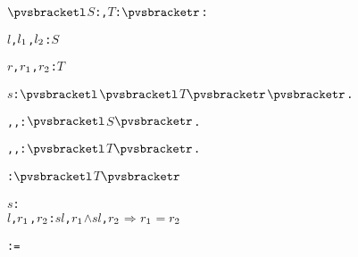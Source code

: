 \def\setsothermembertwofn#1#2{{(#1 \in #2)}}%
\def\opohtwofn#1#2{{#1\circ#2}}%
\def\opdividetwofn#1#2{{\frac{#1}{#2}}}%
\def\optimestwofn#1#2{{#1\times#2}}%
\def\opdifferenceonefn#1{{-#1}}%
\def\opdifferencetwofn#1#2{{#1-#2}}%
\def\opplustwofn#1#2{{#1+#2}}%
\begin{alltt}
\({\pvsbracketl}\)\(S\): , \(T\): \({\pvsbracketr}\): 

   

  \(l\), \(l\sb{1}\), \(l\sb{2}\):  \(S\)\vspace*{\pvsdeclspacing}

  \(r\), \(r\sb{1}\), \(r\sb{2}\):  \(T\)\vspace*{\pvsdeclspacing}

  \(s\):  \({\pvsbracketl}\)\({\pvsbracketl}\)\(T\)\({\pvsbracketr}\)\({\pvsbracketr}\).\vspace*{\pvsdeclspacing}

  , , :  \({\pvsbracketl}\)\(S\)\({\pvsbracketr}\).\vspace*{\pvsdeclspacing}

  , , :  \({\pvsbracketl}\)\(T\)\({\pvsbracketr}\).\vspace*{\pvsdeclspacing}

  :  \({\pvsbracketl}\)\(T\)\({\pvsbracketr}\)\vspace*{\pvsdeclspacing}

  \pvsid{(}\(s\)\pvsid{)}:  \pvskey{=}
       \pvsid{(}\(l\), \(r\sb{1}\), \(r\sb{2}\)\pvsid{)}: \pvsid{(}\(s\)\pvsid{(}\(l\), \(r\sb{1}\)\pvsid{)} \(\wedge\) \(s\)\pvsid{(}\(l\), \(r\sb{2}\)\pvsid{)} \(\Rightarrow\) \(r\sb{1}\) \(=\) \(r\sb{2}\)\pvsid{)}\vspace*{\pvsdeclspacing}

  :  = \pvsid{(}\pvsid{)}\vspace*{\pvsdeclspacing}


\end{alltt}
